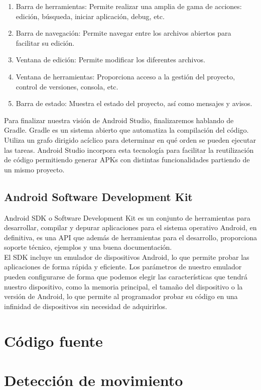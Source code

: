 
\begin{enumerate}
\item Barra de herramientas: Permite realizar una amplia de gama de acciones: edición, búsqueda, iniciar aplicación, debug, etc. 
\item Barra de navegación: Permite navegar entre los archivos abiertos para facilitar su edición.
\item Ventana de edición: Permite modificar los diferentes archivos.
\item Ventana de herramientas: Proporciona acceso a la gestión del proyecto, control de versiones, consola, etc.
\item Barra de estado: Muestra el estado del proyecto, así como mensajes y avisos.
\end{enumerate}

Para finalizar nuestra visión de Android Studio, finalizaremos hablando de Gradle. Gradle es un sistema abierto que automatiza la compilación del código. Utiliza un grafo dirigido acíclico para determinar en qué orden se pueden ejecutar las tareas. Android Studio incorpora esta tecnología para facilitar la reutilización de código permitiendo generar APKs con distintas funcionalidades partiendo de un mismo proyecto.

\subsection{Android Software Development Kit}

Android SDK o Software Development Kit es un conjunto de herramientas para desarrollar, compilar y depurar aplicaciones para el sistema operativo Android, en definitiva, es una API que además de herramientas para el desarrollo, proporciona soporte técnico, ejemplos y una buena documentación.\\

El SDK incluye un emulador de dispositivos Android, lo que permite probar las aplicaciones de forma rápida y eficiente. Los parámetros de nuestro emulador pueden configurarse de forma que podemos elegir las características que tendrá nuestro dispositivo, como la memoria principal, el tamaño del dispositivo o la versión de Android, lo que permite al programador probar su código en una infinidad de dispositivos sin necesidad de adquirirlos.

\section{Código fuente}

\section{Detección de movimiento}



